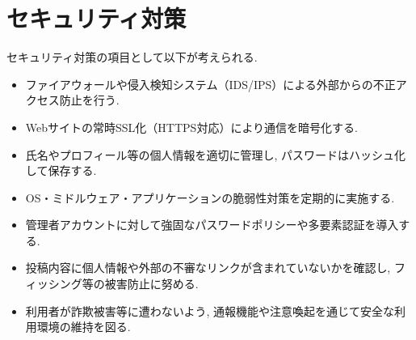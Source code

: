 \section{セキュリティ対策}
セキュリティ対策の項目として以下が考えられる.
\begin{itemize}
    \item ファイアウォールや侵入検知システム（IDS/IPS）による外部からの不正アクセス防止を行う.

    \item Webサイトの常時SSL化（HTTPS対応）により通信を暗号化する.

    \item 氏名やプロフィール等の個人情報を適切に管理し, パスワードはハッシュ化して保存する.

    \item OS・ミドルウェア・アプリケーションの脆弱性対策を定期的に実施する.

    \item 管理者アカウントに対して強固なパスワードポリシーや多要素認証を導入する.

    \item 投稿内容に個人情報や外部の不審なリンクが含まれていないかを確認し, フィッシング等の被害防止に努める.

    \item 利用者が詐欺被害等に遭わないよう, 通報機能や注意喚起を通じて安全な利用環境の維持を図る.
\end{itemize}